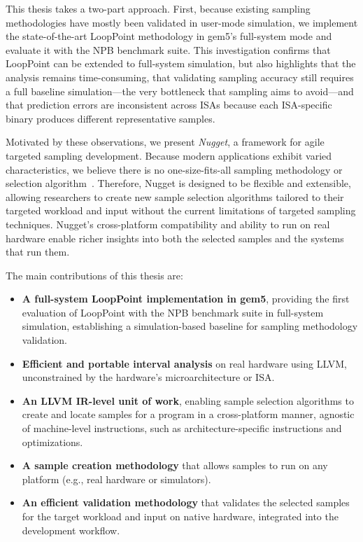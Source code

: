 This thesis takes a two-part approach.
First, because existing sampling methodologies have mostly been validated in user-mode simulation, we implement the state-of-the-art LoopPoint methodology in gem5's full-system mode and evaluate it with the NPB benchmark suite.
This investigation confirms that LoopPoint can be extended to full-system simulation, but also highlights that the analysis remains time-consuming, that validating sampling accuracy still requires a full baseline simulation---the very bottleneck that sampling aims to avoid---and that prediction errors are inconsistent across ISAs because each ISA-specific binary produces different representative samples.

Motivated by these observations, we present \emph{Nugget}, a framework for agile targeted sampling development.
Because modern applications exhibit varied characteristics, we believe there is no one-size-fits-all sampling methodology or selection algorithm~\cite{survey_phase_classification,accl_warmup_sampled_simulation,characterizing_and_comparing_prevailing_simulation_techniques,analysis_of_statistical_sampling_in_microarchitecture_simulation}.
Therefore, Nugget is designed to be flexible and extensible, allowing researchers to create new sample selection algorithms tailored to their targeted workload and input without the current limitations of targeted sampling techniques.
Nugget's cross-platform compatibility and ability to run on real hardware enable richer insights into both the selected samples and the systems that run them.

The main contributions of this thesis are:

\begin{itemize}
    \item \textbf{A full-system LoopPoint implementation in gem5}, providing the first evaluation of LoopPoint with the NPB benchmark suite in full-system simulation, establishing a simulation-based baseline for sampling methodology validation.
    \item \textbf{Efficient and portable interval analysis} on real hardware using LLVM, unconstrained by the hardware's microarchitecture or ISA.
    \item \textbf{An LLVM IR-level unit of work}, enabling sample selection algorithms to create and locate samples for a program in a cross-platform manner, agnostic of machine-level instructions, such as architecture-specific instructions and optimizations.
    \item \textbf{A sample creation methodology} that allows samples to run on any platform (e.g., real hardware or simulators).
    \item \textbf{An efficient validation methodology} that validates the selected samples for the target workload and input on native hardware, integrated into the development workflow.
\end{itemize}

